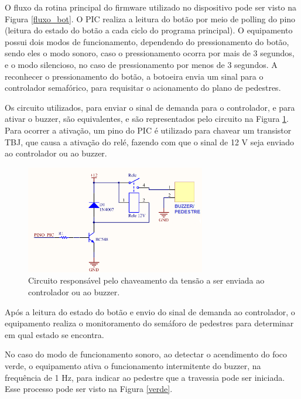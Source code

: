 O fluxo da rotina principal do firmware utilizado no dispositivo pode ser visto na Figura \ref{fluxo_bot}. O PIC realiza a leitura do botão por meio de polling do pino (leitura do estado do botão a cada ciclo do programa principal). O equipamento possui dois modos de funcionamento, dependendo do pressionamento do botão, sendo eles o modo sonoro, caso o pressionamento ocorra por mais de 3 segundos, e o modo silencioso, no caso de pressionamento por menos de 3 segundos. A reconhecer o pressionamento do botão, a botoeira envia um sinal para o controlador semafórico, para requisitar o acionamento do plano de pedestres. 

Os circuito utilizados, para enviar o sinal de demanda para o controlador, e para ativar o buzzer, são equivalentes, e são representados pelo circuito na Figura \ref{envio_demanda}. Para ocorrer a ativação, um pino do PIC é utilizado para chavear um transistor TBJ, que causa a ativação do relé, fazendo com que o sinal de 12 V seja enviado ao controlador ou ao buzzer. 

\begin{figure}[ht]
    \begin{center}
    \includegraphics[width=0.7\textwidth]{figuras/envio_demanda.PNG}
    \end{center}
    \caption[Circuito de chaveamento 12V]{Circuito responsável pelo chaveamento da tensão a ser enviada ao controlador ou ao buzzer.}
    \label{envio_demanda}
\end{figure}

Após a leitura do estado do botão e envio do sinal de demanda ao controlador, o equipamento realiza o monitoramento do semáforo de pedestres para determinar em qual estado se encontra.

No caso do modo de funcionamento sonoro, ao detectar o acendimento do foco verde, o equipamento ativa o funcionamento intermitente do buzzer, na frequência de 1 Hz, para indicar ao pedestre que a travessia pode ser iniciada. Esse processo pode ser visto na Figura \ref{verde}. 

